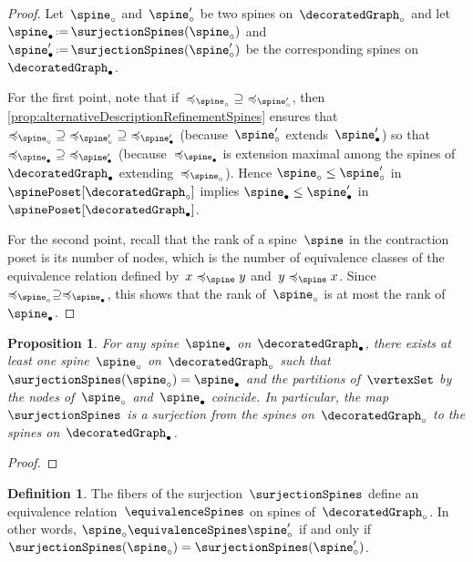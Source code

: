 \documentclass{amsart}
\newtheorem{proposition}[theorem]{Proposition}
\theoremstyle{definition}
\newtheorem{definition}[theorem]{Definition}
\newcommand{\eqdef}{\mbox{\,\raisebox{0.2ex}{\scriptsize\ensuremath{\mathrm:}}\ensuremath{=}\,}} %
\newcommand{\vincent}[1]{\todo[color=blue!30]{#1 \\ \hfill --- V.}}
\begin{document}
\begin{proof}
  Let~$\spine_\circ$ and~$\spine_\circ'$ be two spines on~$\decoratedGraph_\circ$ and let~$\spine_\bullet \eqdef \surjectionSpines(\spine_\circ)$ and~$\spine_\bullet' \eqdef \surjectionSpines(\spine_\circ')$ be the corresponding spines on~$\decoratedGraph_\bullet$.
  
  For the first point, note that if~${\preccurlyeq_{\spine_\circ}} \supseteq {\preccurlyeq_{\spine_\circ'}}$, then \cref{prop:alternativeDescriptionRefinementSpines} ensures that~${\preccurlyeq_{\spine_\circ}} \supseteq {\preccurlyeq_{\spine_\circ'}} \supseteq {\preccurlyeq_{\spine_\bullet'}}$ (because~$\spine_\circ'$ extends~$\spine_\bullet'$) so that~${\preccurlyeq_{\spine_\bullet}} \supseteq {\preccurlyeq_{\spine_\bullet'}}$ (because~$\preccurlyeq_{\spine_\bullet}$ is extension maximal among the spines of~$\decoratedGraph_\bullet$ extending~$\preccurlyeq_{\spine_\circ}$).
  Hence $\spine_\circ \le \spine_\circ'$  in~$\spinePoset[\decoratedGraph_\circ]$ implies $\spine_\bullet \le \spine_\bullet'$ in~$\spinePoset[\decoratedGraph_\bullet]$.

  For the second point, recall that the rank of a spine~$\spine$ in the contraction poset is its number of nodes, which is the number of equivalence classes of the equivalence relation defined by~$x \preccurlyeq_{\spine} y$ and~$y \preccurlyeq_{\spine} x$.
  Since~$\preccurlyeq_{\spine_\circ} \supseteq \preccurlyeq_{\spine_\bullet}$, this shows that the rank of~$\spine_\circ$ is at most the rank of~$\spine_\bullet$.
\end{proof}

\begin{proposition}
  \label{prop:refinementSpines}
  For any spine~$\spine_\bullet$ on~$\decoratedGraph_\bullet$, there exists at least one spine~$\spine_\circ$ on~$\decoratedGraph_\circ$ such that ${\surjectionSpines(\spine_\circ) = \spine_\bullet}$ and the partitions of~$\vertexSet$ by the nodes of~$\spine_\circ$ and~$\spine_\bullet$ coincide.
  In particular, the map~$\surjectionSpines$ is a surjection from the spines on~$\decoratedGraph_\circ$ to the spines on~$\decoratedGraph_\bullet$.
\end{proposition}

\begin{proof}
  \vincent{todo}
\end{proof}

\begin{definition}
  \label{def:equivalenceRelation}
  The fibers of the surjection~$\surjectionSpines$ define an equivalence relation~$\equivalenceSpines$ on spines of~$\decoratedGraph_\circ$. In other words, $\spine_\circ \equivalenceSpines \spine_\circ'$ if and only if~$\surjectionSpines(\spine_\circ) = \surjectionSpines(\spine_\circ')$.
\end{definition}
\end{document}
